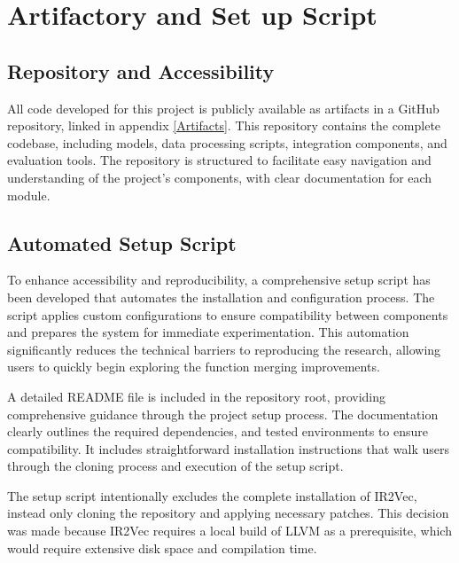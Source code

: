 
\section{Artifactory and Set up Script}
\subsection{Repository and Accessibility}
All code developed for this project is publicly available as artifacts in a GitHub repository, linked in appendix \ref{Artifacts}. This repository contains the complete codebase, including models, data processing scripts, integration components, and evaluation tools. The repository is structured to facilitate easy navigation and understanding of the project's components, with clear documentation for each module.

\subsection{Automated Setup Script}
To enhance accessibility and reproducibility, a comprehensive setup script has been developed that automates the installation and configuration process. The script applies custom configurations to ensure compatibility between components and prepares the system for immediate experimentation. This automation significantly reduces the technical barriers to reproducing the research, allowing users to quickly begin exploring the function merging improvements.

A detailed README file is included in the repository root, providing comprehensive guidance through the project setup process. The documentation clearly outlines the required dependencies, and tested environments to ensure compatibility. It includes straightforward installation instructions that walk users through the cloning process and execution of the setup script.

The setup script intentionally excludes the complete installation of IR2Vec, instead only cloning the repository and applying necessary patches. This decision was made because IR2Vec requires a local build of LLVM as a prerequisite, which would require extensive disk space and compilation time.













